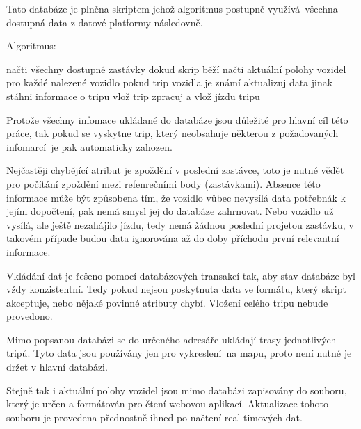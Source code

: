 Tato databáze je plněna skriptem jehož algoritmus postupně využívá všechna dostupná data z datové platformy následovně.

\bigbreak

Algoritmus:
\begin{code}[frame=none]
načti všechny dostupné zastávky
dokud skrip běží
	načti aktuální polohy vozidel
	pro každé nalezené vozidlo
		pokud trip vozidla je známí
			aktualizuj data
		jinak
			stáhni informace o tripu
			vlož trip
			zpracuj a vlož jízdu tripu
\end{code}

\bigbreak

Protože všechny infomace ukládané do databáze jsou důležité pro hlavní cíl této práce, tak pokud se vyskytne trip, který neobsahuje některou z požadovaných infomarcí je pak automaticky zahozen.

\bigbreak

Nejčastěji chybějící atribut je zpoždění v poslední zastávce, toto je nutné vědět pro počítání zpoždění mezi refenrečními body (zastávkami). Absence této informace může být způsobena tím, že vozidlo vůbec nevysílá data potřebnák k jejím dopočtení, pak nemá smysl jej do databáze zahrnovat. Nebo vozidlo už vysílá, ale ještě nezahájilo jízdu, tedy nemá žádnou poslední projetou zastávku, v takovém případe budou data ignorována až do doby příchodu první relevantní informace.

\bigbreak

Vkládání dat je řešeno pomocí databázových transakcí tak, aby stav databáze byl vždy konzistentní. Tedy pokud nejsou poskytnuta data ve formátu, který skript akceptuje, nebo nějaké povinné atributy chybí. Vložení celého tripu nebude provedono.

\bigbreak

Mimo popsanou databázi se do určeného adresáře ukládají trasy jednotlivých tripů. Tyto data jsou používány jen pro vykreslení na mapu, proto není nutné je držet v hlavní databázi.

\bigbreak

 Stejně tak i aktuální polohy vozidel jsou mimo databázi zapisovány do souboru, který je určen a formátován pro čtení webovou aplikací. Aktualizace tohoto souboru je provedena přednostně ihned po načtení real-timových dat.

